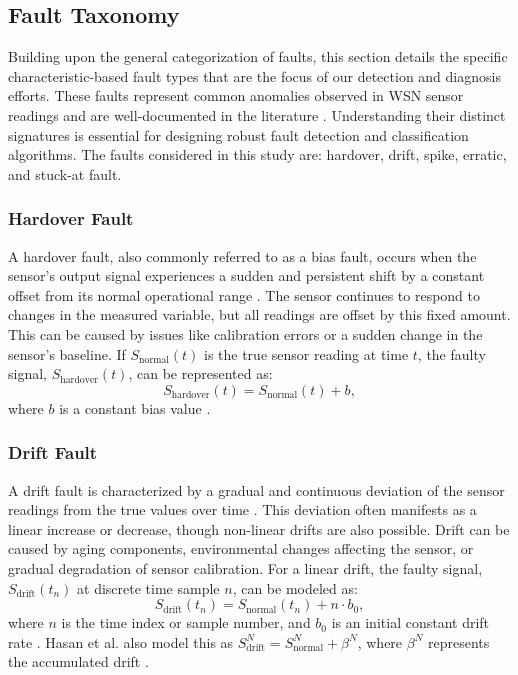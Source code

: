 \subsection{Fault Taxonomy}
\label{subsec:types}
Building upon the general categorization of faults, this section details the specific characteristic-based fault types that are the focus of our detection and diagnosis efforts. These faults represent common anomalies observed in WSN sensor readings and are well-documented in the literature \cite{Saeed2021, Hasan2024, Shi2024, Ni2009}. Understanding their distinct signatures is essential for designing robust fault detection and classification algorithms. The faults considered in this study are: hardover, drift, spike, erratic, and stuck-at fault. 

\subsubsection{Hardover Fault}
A hardover fault, also commonly referred to as a bias fault, occurs when the sensor's output signal experiences a sudden and persistent shift by a constant offset from its normal operational range \cite{Saeed2021, Shi2024, Hasan2024}. The sensor continues to respond to changes in the measured variable, but all readings are offset by this fixed amount. This can be caused by issues like calibration errors or a sudden change in the sensor's baseline. If \(S_\text{normal}(t)\) is the true sensor reading at time \(t\), the faulty signal, \(S_\text{hardover}(t)\), can be represented as:
\begin{equation}
  S_\text{hardover}(t) = S_\text{normal}(t) + b,
  \label{eq:hardover}
\end{equation}
where \(b\) is a constant bias value \cite{Saeed2021}.

\subsubsection{Drift Fault}
A drift fault is characterized by a gradual and continuous deviation of the sensor readings from the true values over time \cite{Saeed2021, Hasan2024}. This deviation often manifests as a linear increase or decrease, though non-linear drifts are also possible. Drift can be caused by aging components, environmental changes affecting the sensor, or gradual degradation of sensor calibration. For a linear drift, the faulty signal, \(S_\text{drift}(t_n)\) at discrete time sample \(n\), can be modeled as:
\begin{equation}
S_\text{drift}(t_n) = S_\text{normal}(t_n) + n \cdot b_0,
\label{eq:drift}
\end{equation}
where \(n\) is the time index or sample number, and \(b_0\) is an initial constant drift rate \cite{Saeed2021}. Hasan et al. also model this as \(S_\text{drift}^N = S_\text{normal}^N +\beta^N\), where \(\beta^N\) represents the accumulated drift \cite{Hasan2024}.

